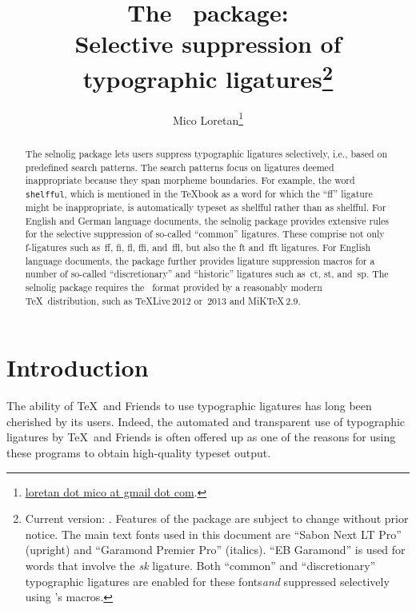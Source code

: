 \documentclass[11pt]{article}
\title{The \selnoligpackagename\ package: \\
Selective suppression of typographic ligatures\thanks{
Current version: \selnoligpackageversion. Features of the \pkg{selnolig} package are subject to change without prior notice. 
\newline\hspace*{\parindent}
The main text fonts used in this document are \enquote{Sabon Next LT Pro} (upright) and \enquote{Garamond Premier Pro} (italics). \enquote{EB Garamond} is used for words that involve the \emph{\mbox{\ebg sk}} ligature. Both \enquote{common} and \enquote{discretionary} typographic ligatures are enabled for these fonts\textemdash \emph{and} suppressed selectively using \pkg{selnolig}'s macros.}}
\author{Mico Loretan\thanks{
\href{mailto:loretan.mico@gmail.com}{loretan dot mico at gmail dot com}.}}
\date{\selnoligpackagedate}
\newcommand{\pkg}[1]{\textsf{#1}}
\newcommand{\opt}[1]{\texttt{#1}}
\begin{document}
\VerbatimFootnotes
{}
\maketitle


\begin{abstract}

The \pkg{selnolig} package lets users suppress typographic ligatures selectively, i.e., based on predefined search patterns. The search patterns focus on ligatures deemed inappropriate because they span morpheme boundaries. For example, the word \opt{shelfful}, which is mentioned in the \TeX book as a word for which the \enquote{ff} ligature might be inappropriate, is automatically typeset as shelfful rather than as shel\mbox{ff}ul.
\newline\hspace*{\parindent}
For English and German language documents, the \pkg{selnolig} package provides extensive rules for the selective suppression of so-called \enquote{common} ligatures. These comprise not only f-ligatures such as~ff, fi, fl, ffi, and~ffl, but also the ft and~fft ligatures.
\newline\hspace*{\parindent}
For English language documents, the package further provides ligature suppression macros for a number of so-called \enquote{discretionary} and \enquote{historic} ligatures such as~ct, st, and~sp.
\newline\hspace*{\parindent}
The \pkg{selnolig} package requires the \LuaLaTeX\ format provided by a reasonably modern \TeX\ distribution, such as \TeX Live\,2012 or~2013 and MiK\TeX\,2.9.
\end{abstract}


\tableofcontents

\clearpage
{}
\section{Introduction}

The ability of \TeX\ and Friends to use typographic ligatures has long been cherished by its users. Indeed, the automated and transparent use of typographic ligatures by \TeX\ and Friends is often offered up as one of the reasons for using these programs to obtain high-quality typeset output.
\end{document}
